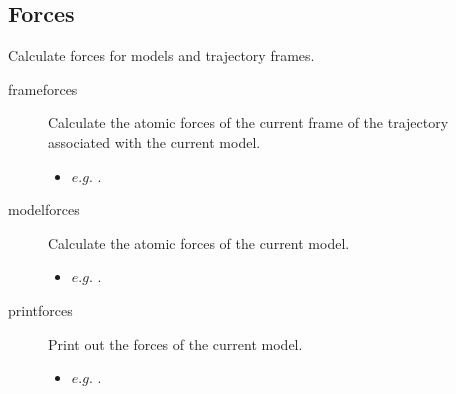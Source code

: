 \subsection{Forces}
Calculate forces for models and trajectory frames.\\
\begin{description}

	\item[frameforces\its] Calculate the atomic forces of the current frame of the trajectory associated with the current model.
	\begin{itemize}
		\item $e.g.$ .
	\end{itemize}

	\item[modelforces\its] Calculate the atomic forces of the current model.
	\begin{itemize}
		\item $e.g.$ .
	\end{itemize}

	\item[printforces\its] Print out the forces of the current model.
	\begin{itemize}
		\item $e.g.$ .
	\end{itemize}

\end{description}

